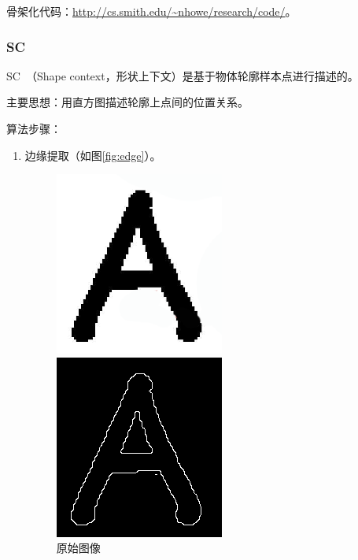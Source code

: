 \documentclass[12pt]{article}
\begin{document}
{\color{blue}骨架化代码}：\url{http://cs.smith.edu/~nhowe/research/code/}。

\subsubsection{SC}
    
    SC~\cite{belongie2002shape}（Shape context，形状上下文）是基于物体轮廓样本点进行描述的。
    
    {\color{blue}主要思想}：用直方图描述轮廓上点间的位置关系。
    
    {\color{blue}算法步骤}：
    \begin{enumerate}
        \item 边缘提取（如图\ref{fig:edge}）。
           \begin{figure}
            \centering
              \begin{minipage}[t]{0.2\linewidth}
              \centering
              \includegraphics[width=0.6\linewidth]{a1} 
              \caption{原始图像}
              \label{fig:org}
              \end{minipage}
              \begin{minipage}[t]{0.2\linewidth}
              \centering
              \includegraphics[width=0.6\linewidth]{a-edge}

\end{minipage}
\end{figure}
\end{enumerate}
\end{document}
